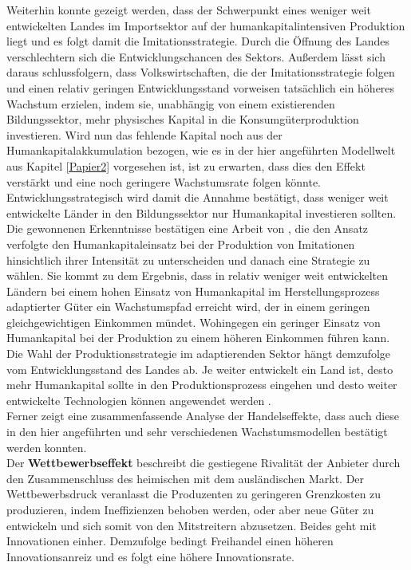 %
Weiterhin konnte gezeigt werden, dass der Schwerpunkt eines weniger weit entwickelten Landes im Importsektor auf der humankapitalintensiven Produktion liegt und es folgt damit die Imitationsstrategie. Durch die Öffnung des Landes verschlechtern sich die Entwicklungschancen des Sektors. 
Außerdem lässt sich daraus schlussfolgern, dass Volkswirtschaften, die der Imitationsstrategie folgen und einen relativ geringen Entwicklungsstand vorweisen tatsächlich ein höheres Wachstum erzielen, indem sie, unabhängig von einem existierenden Bildungssektor, mehr physisches Kapital in die Konsumgüterproduktion investieren. Wird nun das fehlende Kapital noch aus der Humankapitalakkumulation bezogen, wie es in der hier angeführten Modellwelt aus Kapitel \ref{Papier2} vorgesehen ist, ist zu erwarten, dass dies den Effekt verstärkt und eine noch geringere Wachstumsrate folgen könnte. Entwicklungsstrategisch wird damit die Annahme bestätigt, dass weniger weit entwickelte Länder in den Bildungssektor nur Humankapital investieren sollten.\\
%
Die gewonnenen Erkenntnisse bestätigen eine Arbeit von \cite{Mies.2013}, die den Ansatz verfolgte den Humankapitaleinsatz bei der Produktion von Imitationen hinsichtlich ihrer Intensität zu unterscheiden und danach eine Strategie zu wählen. Sie kommt zu dem Ergebnis, dass in relativ weniger weit entwickelten Ländern bei einem hohen Einsatz von Humankapital im Herstellungsprozess adaptierter Güter ein Wachstumspfad erreicht wird, der in einem geringen gleichgewichtigen Einkommen mündet. Wohingegen ein geringer Einsatz von Humankapital bei der Produktion zu einem höheren Einkommen führen kann. Die Wahl der Produktionsstrategie im adaptierenden Sektor hängt demzufolge vom Entwicklungsstand des Landes ab. Je weiter entwickelt ein Land ist, desto mehr Humankapital sollte in den Produktionsprozess eingehen und desto weiter entwickelte Technologien können angewendet werden \cite{Mies.2013}.\\
%
Ferner zeigt eine zusammenfassende Analyse der Handelseffekte, dass auch diese in den hier angeführten und sehr verschiedenen Wachstumsmodellen bestätigt werden konnten.\\
%
Der \textbf{Wettbewerbseffekt} beschreibt die gestiegene Rivalität der Anbieter durch den Zusammenschluss des heimischen mit dem ausländischen Markt. Der Wettbewerbsdruck veranlasst die Produzenten zu geringeren Grenzkosten zu produzieren, indem Ineffizienzen behoben werden, oder aber neue Güter zu entwickeln und sich somit von den Mitstreitern abzusetzen. Beides geht mit Innovationen einher. Demzufolge bedingt Freihandel einen höheren Innovationsanreiz und es folgt eine höhere Innovationsrate. \\
